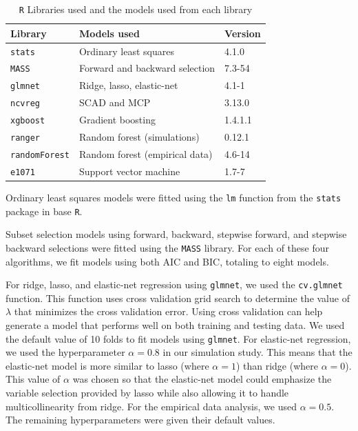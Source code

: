 \documentclass{article}
\begin{document}
	\begin{table}[h]
		\centering
		\caption{\lstinline!R! Libraries used and the models used from each library}
		\label{tab:model-libraries}
		\begin{tabular}{lll}\hline
			\textbf{Library}    	  & \textbf{Models used}                                 & \textbf{Version} \\ \hline
			\lstinline!stats! \cite{r}   	  & Ordinary least squares                               & 4.1.0            \\
			\lstinline!MASS! \cite{venables2002mass}   	  & Forward and backward selection                       & 7.3-54           \\
			\lstinline!glmnet! \cite{friedman2010regularization} 	  & Ridge, lasso, elastic-net                            & 4.1-1            \\
			\lstinline!ncvreg! \cite{breheny2011ncvreg}	      & SCAD and MCP                                         & 3.13.0           \\
			\lstinline!xgboost! \cite{chen2021xgboost}	  & Gradient boosting                                    & 1.4.1.1          \\
			\lstinline!ranger! \cite{wright2017ranger} 	  & Random forest (simulations)                          & 0.12.1           \\
			\lstinline!randomForest! \cite{liaw2002rf} & Random forest (empirical data)                       & 4.6-14           \\
			\lstinline!e1071! \cite{meyer2021e1071}  	  & Support vector machine                               & 1.7-7            \\\hline
		\end{tabular}
	\end{table}
	
	Ordinary least squares models were fitted using the \lstinline!lm! function from the \lstinline!stats! package in base \lstinline!R!.
	
	Subset selection models using forward, backward, stepwise forward, and stepwise backward selections were fitted using the \lstinline!MASS! library. For each of these four algorithms, we fit models using both AIC and BIC, totaling to eight models.
	
	For ridge, lasso, and elastic-net regression using \lstinline!glmnet!, we used the \lstinline!cv.glmnet! function. This function uses cross validation grid search to determine the value of $\lambda$ that minimizes the cross validation error. Using cross validation can help generate a model that performs well on both training and testing data. We used the default value of 10 folds to fit models using \lstinline!glmnet!. For elastic-net regression, we used the hyperparameter $\alpha = 0.8$ in our simulation study. This means that the elastic-net model is more similar to lasso (where $\alpha = 1$) than ridge (where $\alpha = 0$). This value of $\alpha$ was chosen so that the elastic-net model could emphasize the variable selection provided by lasso while also allowing it to handle multicollinearity from ridge. For the empirical data analysis, we used $\alpha = 0.5$. The remaining hyperparameters were given their default values.
	
\end{document}
